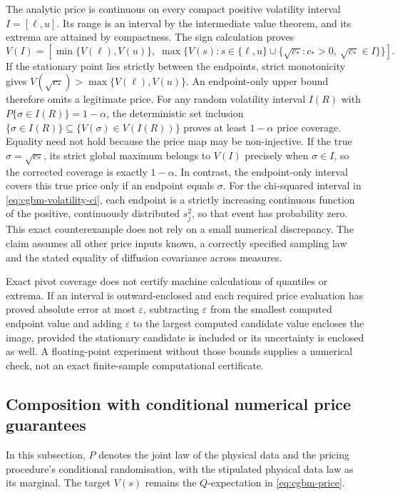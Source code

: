 \documentclass[11pt]{article}
\begin{document}
The analytic price is continuous on every compact positive volatility
interval $I=[\ell,u]$. Its range is an interval by the intermediate
value theorem, and its extrema are attained by compactness. The sign
calculation proves
\begin{equation}
 V(I)=\left[\min\{V(\ell),V(u)\},\;
 \max\{V(s):s\in\{\ell,u\}\cup
 \{\sqrt{c_*}:c_*>0,\ \sqrt{c_*}\in I\}\}\right].
 \label{eq:cgbm-confidence-price-image}
\end{equation}
If the stationary point lies strictly between the endpoints, strict
monotonicity gives $V(\sqrt{c_*})>\max\{V(\ell),V(u)\}$.
An endpoint-only upper bound therefore omits a legitimate price.
For any random volatility interval $I(R)$ with
$P\{\sigma\in I(R)\}=1-\alpha$, the deterministic set inclusion
$\{\sigma\in I(R)\}\subseteq\{V(\sigma)\in V(I(R))\}$
proves at least $1-\alpha$ price coverage. Equality need not hold
because the price map may be non-injective. If the true
$\sigma=\sqrt{c_*}$, its strict global maximum belongs to $V(I)$
precisely when $\sigma\in I$, so the corrected coverage is exactly
$1-\alpha$. In contrast, the endpoint-only interval covers this true
price only if an endpoint equals $\sigma$. For the chi-squared interval
in \eqref{eq:cgbm-volatility-ci}, each endpoint is a strictly increasing
continuous function of the positive, continuously distributed $s_j^2$,
so that event has probability zero. This exact counterexample does
not rely on a small numerical discrepancy. The claim assumes all
other price inputs known, a correctly specified sampling law and
the stated equality of diffusion covariance across measures.

Exact pivot coverage does not certify machine calculations of
quantiles or extrema. If an interval is outward-enclosed and each
required price evaluation has proved absolute error at most
$\varepsilon$, subtracting $\varepsilon$ from the smallest computed
endpoint value and adding $\varepsilon$ to the largest computed
candidate value encloses the image, provided the stationary candidate
is included or its uncertainty is enclosed as well. A floating-point
experiment without those bounds supplies a numerical check, not
an exact finite-sample computational certificate.

\subsection{Composition with conditional numerical price guarantees}

In this subsection, $P$ denotes the joint law of the physical data and
the pricing procedure's conditional randomisation, with the stipulated
physical data law as its marginal. The target $V(s)$ remains the
$Q$-expectation in \eqref{eq:cgbm-price}.
\end{document}
